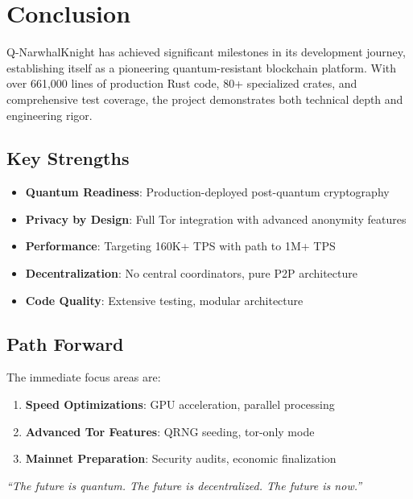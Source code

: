\documentclass[12pt,a4paper]{article}
\begin{document}
\section{Conclusion}

Q-NarwhalKnight has achieved significant milestones in its development journey, establishing itself as a pioneering quantum-resistant blockchain platform. With over 661,000 lines of production Rust code, 80+ specialized crates, and comprehensive test coverage, the project demonstrates both technical depth and engineering rigor.

\subsection{Key Strengths}

\begin{itemize}
    \item \textbf{Quantum Readiness}: Production-deployed post-quantum cryptography
    \item \textbf{Privacy by Design}: Full Tor integration with advanced anonymity features
    \item \textbf{Performance}: Targeting 160K+ TPS with path to 1M+ TPS
    \item \textbf{Decentralization}: No central coordinators, pure P2P architecture
    \item \textbf{Code Quality}: Extensive testing, modular architecture
\end{itemize}

\subsection{Path Forward}

The immediate focus areas are:
\begin{enumerate}
    \item \textbf{Speed Optimizations}: GPU acceleration, parallel processing
    \item \textbf{Advanced Tor Features}: QRNG seeding, tor-only mode
    \item \textbf{Mainnet Preparation}: Security audits, economic finalization
\end{enumerate}

\vspace{1cm}
\begin{center}
\textit{``The future is quantum. The future is decentralized. The future is now.''}
\end{center}
\end{document}
